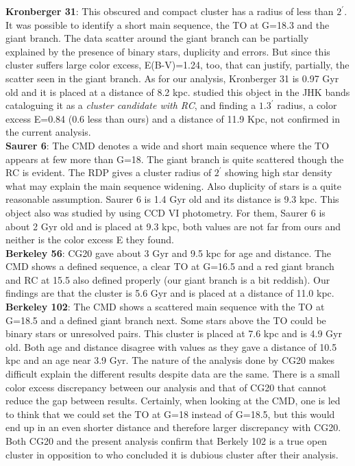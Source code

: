 \documentclass[draft]{aa}
\begin{document}
  \textbf{Kronberger 31}: This obscured and compact cluster has a radius
  of less than $2^{\prime}$. It was possible to identify a short
  main sequence, the TO at G=18.3 and the giant branch. The data scatter
  around the giant branch can be partially explained by the presence of
  binary stars, duplicity and errors. But since this cluster suffers large
  color excess, E(B-V)=1.24, too, that can justify, partially, the scatter
  seen in the giant branch. As for our analysis, Kronberger 31 is 0.97 Gyr
  old and it is placed at a distance of 8.2 kpc. \cite{Kronberger_2006}
  studied this object in the JHK bands cataloguing it as a \emph{cluster
  candidate with RC}, and finding a $1.3^{\prime}$ radius, a color
  excess E=0.84 (0.6 less than ours) and a distance of 11.9 Kpc, not
  confirmed in the current analysis.\\

  \textbf{Saurer 6}: The CMD denotes a wide and short main sequence where the TO
  appears at few more than G=18. The giant branch is quite scattered though the
  RC is evident. The RDP gives a cluster radius of $2^{\prime}$ showing high
  star density what may explain the main sequence widening. Also duplicity of
  stars is a quite reasonable assumption. Saurer 6 is 1.4 Gyr old and its
  distance is 9.3 kpc. This object also was studied by
  \cite{Frinchaboy_2002} using CCD VI photometry. For them, Saurer 6 is about 2
  Gyr old and is placed at 9.3 kpc, both values are not far from ours and
  neither is the color excess E they found.\\

  \textbf{Berkeley 56}: CG20 gave about 3 Gyr and 9.5 kpc for age and distance. The CMD
  shows a defined sequence, a clear TO at G=16.5 and a red giant branch and RC
  at 15.5 also defined properly (our giant branch is a bit reddish).  Our
  findings are that the cluster is 5.6 Gyr and is placed at a distance of 11.0
  kpc.\\

  \textbf{Berkeley 102}: The CMD shows a scattered main sequence with the
  TO at G=18.5 and a defined giant branch next. Some stars above the TO could be
  binary stars or unresolved pairs. This cluster is placed at 7.6 kpc and is 4.9
  Gyr old. Both age and distance disagree with \cite{Cantat_2020}
  values as they gave a distance of 10.5 kpc and an age near
  3.9 Gyr. The nature of the analysis done by CG20 makes difficult
  explain the different results despite data are the same. There is a small
  color excess discrepancy between our analysis and that of CG20 that cannot
  reduce the gap between results. Certainly, when looking at the CMD, one is led
  to think that we could set the TO at G=18 instead of G=18.5, but this would
  end up in an even shorter distance and therefore larger discrepancy with CG20.
  Both CG20 and the present analysis confirm that Berkely 102 is a true open cluster
  in opposition to \cite{Maciejewski_2008} who concluded it is dubious cluster after their
  analysis.\\
\end{document}
